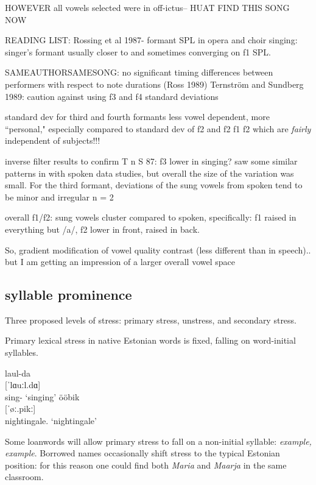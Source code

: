 HOWEVER all vowels selected were in off-ictus-- HUAT
FIND THIS SONG NOW

READING LIST: Rossing et al 1987- formant SPL in opera and choir singing: singer's formant usually closer to and sometimes converging on f1 SPL. 

SAMEAUTHORSAMESONG: no significant timing differences between performers with respect to note durations (Ross 1989)
Ternström and Sundberg 1989: caution against using f3 and f4 standard deviations

standard dev for third and fourth formants less vowel dependent, more ``personal," especially compared to standard dev of f2 and f2 f1 f2 which are {\it fairly} independent of subjects!!!


inverse filter results to confirm T n S 87: f3 lower in singing? 
saw some similar patterns in with spoken data studies, but overall the size of the variation was small. For the third formant, deviations of the sung vowels from spoken tend to be minor and irregular  n = 2

overall f1/f2: sung vowels cluster compared to spoken, specifically:
f1 raised in everything but /a/,
f2 lower in front, raised in back. 

So, gradient modification of vowel quality contrast (less different than in speech).. but I am getting an impression of a larger overall vowel space


\subsection{syllable prominence}

Three proposed levels of stress: primary stress, unstress, and secondary stress. \citep{lippusAcousticStudyEstonian2014a}

Primary lexical stress in native Estonian words is fixed, falling on word-initial syllables. 
\cite{eekmeisterUralica98}
\begin{exe}
\ex \gll laul-da \\
	{[ˈlɑuːl.dɑ]} \\
	sing-\Tr{} 
	\glt	`singing'
\ex 	ööbik \\
	{[ˈøː.pikː]} \\
	nightingale.\Nom{} 
	\glt`nightingale'
\end{exe}

Some loanwords will allow primary stress to fall on a non-initial syllable: {\it example, example}. 
Borrowed names occasionally shift stress to the typical Estonian position: for this reason one could find both {\it Maria} and {\it Maarja} in the same classroom. 

